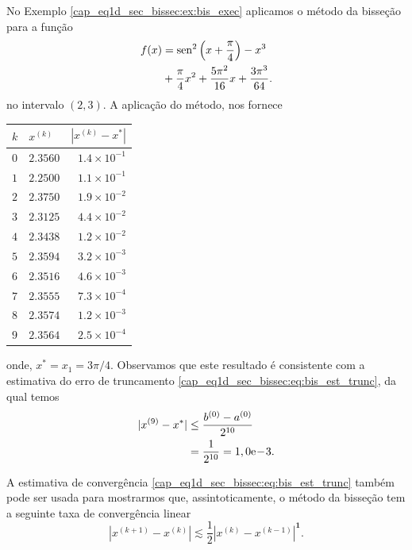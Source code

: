 \begin{ex}\label{cap_eq1d_sec_bissec:ex:bis_convp}
  No Exemplo \ref{cap_eq1d_sec_bissec:ex:bis_exec} aplicamos o método da bisseção para a função
  \begin{equation}
    \begin{aligned}
      f(x) &= \operatorname{sen}^2\left(x+\frac{\pi}{4}\right) - x^3 \\
           &+ \frac{\pi}{4}x^2 + \frac{5\pi^2}{16}x + \frac{3\pi^3}{64}.
    \end{aligned}
\end{equation}
no intervalo $(2, 3)$. A aplicação do método, nos fornece
\begin{center}
  \begin{tabular}[H]{llr}
    $k$ & $x^{(k)}$ & $\left|x^{(k)}-x^{*}\right|$\\\hline
    $0$ & $2.3560$ & $1.4\times 10^{-1}$ \\
    $1$ & $2.2500$ & $1.1\times 10^{-1}$ \\
    $2$ & $2.3750$ & $1.9\times 10^{-2}$ \\
    $3$ & $2.3125$ & $4.4\times 10^{-2}$ \\
    $4$ & $2.3438$ & $1.2\times 10^{-2}$ \\
    $5$ & $2.3594$ & $3.2\times 10^{-3}$ \\
    $6$ & $2.3516$ & $4.6\times 10^{-3}$ \\
    $7$ & $2.3555$ & $7.3\times 10^{-4}$ \\
    $8$ & $2.3574$ & $1.2\times 10^{-3}$ \\
    $9$ & $2.3564$ & $2.5\times 10^{-4}$ \\\hline
  \end{tabular}
\end{center}
onde, $x^* = x_1 = 3\pi/4$. Observamos que este resultado é consistente com a estimativa do erro de truncamento \eqref{cap_eq1d_sec_bissec:eq:bis_est_trunc}, da qual temos
\begin{align}
  |x^{(9)} - x^*| &\leq \frac{b^{(0)}-a^{(0)}}{2^{10}}\\
                  &= \frac{1}{2^{10}} = 1,0\mathrm{e}\!-\!3.
\end{align}
\end{ex}

\begin{obs}
  A estimativa de convergência \eqref{cap_eq1d_sec_bissec:eq:bis_est_trunc} também pode ser usada para mostrarmos que, assintoticamente, o método da bisseção tem a seguinte taxa de convergência linear
  \begin{equation}
    \left|x^{(k+1)} - x^{(k)}\right| \lesssim \frac{1}{2}\left|x^{(k)} - x^{(k-1)}\right|^{\pmb{1}}.
  \end{equation}
\end{obs}

